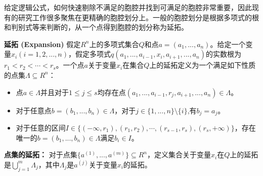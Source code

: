 给定逻辑公式，如何快速剔除不满足的胞腔并找到可满足的胞腔非常重要，因此现有的研究工作很多聚焦在更精确的胞腔划分上。一般的胞腔划分是根据多项式的根和判别式等来判断的，从一个点得到胞腔的划分称为延拓。

\begin{definition}{\textbf{延拓 (Expansion)}}
假定$R^n$上的多项式集合$Q$和点$a = (a_1, ..., a_n)$。给定一个变量$x_i (i = 1, 2,..., n)$，假定多项式$
q(a_1, ..., a_{i-1}, x_i, a_{i+1}, ..., a_n)$的实数根为$r_1 < r_2 < \cdots < r_s$。一个点$a$关于变量$x_i$在集合$Q$上的延拓定义为一个满足如下性质的点集$\Lambda \subseteq R^n$：
\begin{itemize}
    \item 点$a \in \Lambda$并且对于$1 \leq j \leq s$均存在点$(a_1, ..., a_{i-1}, r_j, a_{i+1}, ..., a_n) \in \Lambda$。
    \item 对于任意点$b = (b_1, ..., b_n) \in \Lambda$，对于$j \in \{1, ..., n\} \setminus \{i\}$,有$b_j = a_j$。
    \item 对于任意的区间$I \in \{(-\infty, r_1), (r_1, r_2), \cdots, (r_{s-1}, r_s), (r_s, +\infty)\}$，存在唯一的$b = (b_1, ..., b_n) \in \Lambda$满足$b_i \in I$。
\end{itemize}
\textbf{点集的延拓：} 对于点集$\{a^{(1)}, ..., a^{(m)}\} \subseteq R^n$，定义集合关于变量$x_i$在$Q$上的延拓是$\bigcup_{j=1}^m \Lambda_j$，其中$\Lambda_j$是$a^{(j)}$关于变量$x_i$的延拓。
\end{definition}

